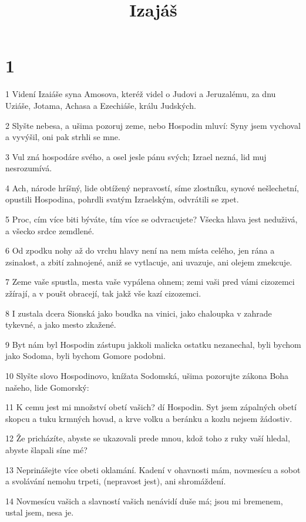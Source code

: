 

\title{Izajáš}

\chapter{1}

\par 1 Videní Izaiáše syna Amosova, kteréž videl o Judovi a Jeruzalému, za dnu Uziáše, Jotama, Achasa a Ezechiáše, králu Judských.
\par 2 Slyšte nebesa, a ušima pozoruj zeme, nebo Hospodin mluví: Syny jsem vychoval a vyvýšil, oni pak strhli se mne.
\par 3 Vul zná hospodáre svého, a osel jesle pánu svých; Izrael nezná, lid muj nesrozumívá.
\par 4 Ach, národe hríšný, lide obtížený nepravostí, síme zlostníku, synové nešlechetní, opustili Hospodina, pohrdli svatým Izraelským, odvrátili se zpet.
\par 5 Proc, cím více biti býváte, tím více se odvracujete? Všecka hlava jest neduživá, a všecko srdce zemdlené.
\par 6 Od zpodku nohy až do vrchu hlavy není na nem místa celého, jen rána a zsinalost, a zbití zahnojené, aniž se vytlacuje, ani uvazuje, ani olejem zmekcuje.
\par 7 Zeme vaše spustla, mesta vaše vypálena ohnem; zemi vaši pred vámi cizozemci zžírají, a v poušt obracejí, tak jakž vše kazí cizozemci.
\par 8 I zustala dcera Sionská jako boudka na vinici, jako chaloupka v zahrade tykevné, a jako mesto zkažené.
\par 9 Byt nám byl Hospodin zástupu jakkoli malicka ostatku nezanechal, byli bychom jako Sodoma, byli bychom Gomore podobni.
\par 10 Slyšte slovo Hospodinovo, knížata Sodomská, ušima pozorujte zákona Boha našeho, lide Gomorský:
\par 11 K cemu jest mi množství obetí vašich? dí Hospodin. Syt jsem zápalných obetí skopcu a tuku krmných hovad, a krve volku a beránku a kozlu nejsem žádostiv.
\par 12 Že pricházíte, abyste se ukazovali prede mnou, kdož toho z ruky vaší hledal, abyste šlapali síne mé?
\par 13 Neprinášejte více obeti oklamání. Kadení v ohavnosti mám, novmesícu a sobot a svolávání nemohu trpeti, (nepravost jest), ani shromáždení.
\par 14 Novmesícu vašich a slavností vašich nenávidí duše má; jsou mi bremenem, ustal jsem, nesa je.

